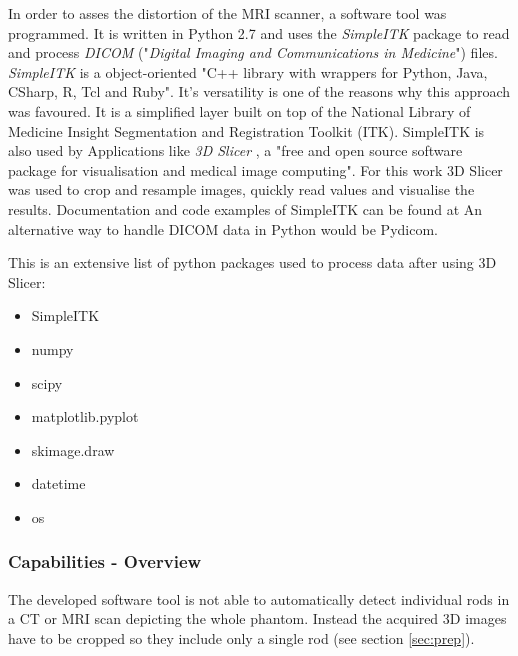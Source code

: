 In order to asses the distortion of the MRI scanner, a software tool was programmed.
It is written in Python 2.7 and uses the \textit{SimpleITK} package to read and process \textit{DICOM} ("\textit{Digital Imaging and Communications in Medicine}") files. \cite{Python, DICOM}
\textit{SimpleITK} is a object-oriented "C++ library with wrappers for Python, Java, CSharp, R, Tcl and Ruby". \cite{SimpleITK, SimpleITK_started} It's versatility is one of the reasons why this approach was favoured.
It is a simplified layer built on top of the National Library of Medicine Insight Segmentation and Registration Toolkit (ITK). SimpleITK is also used by Applications like \textit{3D Slicer} , a "free and open source software package for
visualisation and medical image computing". \cite{3DSlicer, Kikinis2012} For this work 3D Slicer was used to crop and resample images, quickly read values and visualise the results.
Documentation and code examples of SimpleITK can be found at \cite{InsightSoftwareConsortium, Kyriakou-SimpleITK}
An alternative way to handle DICOM data in Python would be Pydicom. \cite{Pydicom, Kyriakou-Pydicom-VTK} 

This is an extensive list of python packages used to process data after using 3D Slicer:
\begin{itemize}
 \item SimpleITK
 \item numpy
 \item scipy
 \item matplotlib.pyplot \cite{Hunter2007}
 \item skimage.draw
 \item datetime
 \item os
\end{itemize}


\subsubsection{Capabilities - Overview}

The developed software tool is not able to automatically detect individual rods in a CT or MRI scan depicting the whole phantom.
Instead the acquired 3D images have to be cropped so they include only a single rod (see section \ref{sec:prep}).

